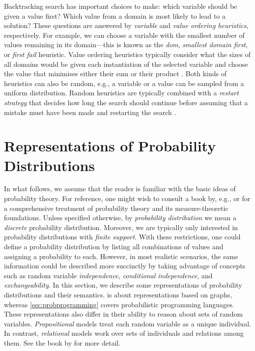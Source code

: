 Backtracking search has important choices to make: which variable should be
given a value first? Which value from a domain is most likely to lead to a
solution? These questions are answered by \emph{variable} and \emph{value
  ordering heuristics}, respectively. For example, we can choose a variable with
the smallest number of values remaining in its domain---this is known as the
\emph{dom}, \emph{smallest domain first}, or \emph{first fail} heuristic. Value
ordering heuristics typically consider what the sizes of all domains would be
given each instantiation of the selected variable and choose the value that
minimises either their sum or their product \citep{DBLP:reference/fai/Beek06}.
Both kinds of heuristics can also be random, e.g., a variable or a value can be
sampled from a uniform distribution. Random heuristics are typically combined
with a \emph{restart strategy} that decides how long the search should continue
before assuming that a mistake must have been made and restarting the search
\citep{DBLP:reference/fai/Beek06}.

\section{Representations of Probability
  Distributions}\label{sec:representations}

In what follows, we assume that the reader is familiar with the basic ideas of
probability theory. For reference, one might wish to consult a book by, e.g.,
\citet{loeve} or \citet{stroock2010probability} for a comprehensive treatment of
probability theory and its measure-theoretic foundations. Unless specified
otherwise, by \emph{probability distribution} we mean a \emph{discrete}
probability distribution. Moreover, we are typically only interested in
probability distributions with \emph{finite support}. With these restrictions,
one could define a probability distribution by listing all combinations of
values and assigning a probability to each. However, in most realistic
scenarios, the same information could be described more succinctly by taking
advantage of concepts such as random variable \emph{independence},
\emph{conditional independence}, and \emph{exchangeability}. In this section, we
describe some representations of probability distributions and their semantics.
 is about representations based on graphs, whereas
\cref{sec:probprogramming} covers probabilistic programming languages. These
representations also differ in their ability to reason about sets of random
variables. \emph{Propositional} models treat each random variable as a unique
individual. In contrast, \emph{relational} models work over sets of individuals
and relations among them. See the book by
\citet{DBLP:series/synthesis/2016Raedt} for more detail.

